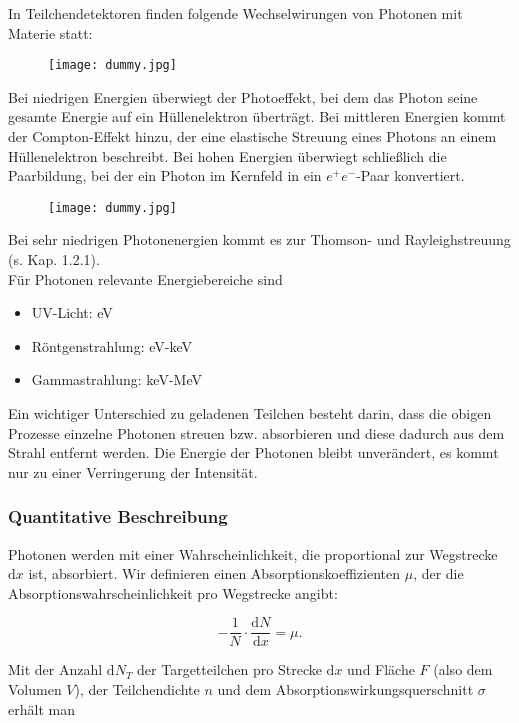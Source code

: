 In Teilchendetektoren finden folgende Wechselwirungen von Photonen mit Materie statt:

\begin{figure}[H]
	\centering
	\texttt{[image: dummy.jpg]}
\end{figure}

Bei niedrigen Energien überwiegt der Photoeffekt, bei dem das Photon seine gesamte Energie auf ein
Hüllenelektron überträgt. Bei mittleren Energien kommt der Compton-Effekt hinzu, der eine elastische
Streuung eines Photons an einem Hüllenelektron beschreibt. Bei hohen Energien überwiegt schließlich
die Paarbildung, bei der ein Photon im Kernfeld in ein $e^+e^-$-Paar konvertiert.

\begin{figure}[H]
	\centering
	\texttt{[image: dummy.jpg]}
\end{figure}

Bei sehr niedrigen Photonenergien kommt es zur Thomson- und Rayleighstreuung (s. Kap. 1.2.1).
\\
Für Photonen relevante Energiebereiche sind  

\begin{itemize}
  \item UV-Licht: eV
  \item Röntgenstrahlung: eV-keV
  \item Gammastrahlung: keV-MeV
\end{itemize}

Ein wichtiger Unterschied zu geladenen Teilchen besteht darin, dass die obigen Prozesse einzelne
Photonen streuen bzw. absorbieren und diese dadurch aus dem Strahl entfernt werden. Die Energie der
Photonen bleibt unverändert, es kommt nur zu einer Verringerung der Intensität.

\subsubsection*{Quantitative Beschreibung}

Photonen werden mit einer Wahrscheinlichkeit, die proportional zur Wegstrecke $\mathrm{d}x$ ist,
absorbiert. Wir definieren einen Absorptionskoeffizienten $\mu$, der die
Absorptionswahrscheinlichkeit pro Wegstrecke angibt:

\[ -\frac{1}{N}\cdot\frac{\mathrm{d}N}{\mathrm{d}x}=\mu.\]

Mit der Anzahl $\mathrm{d}N_T$ der Targetteilchen pro Strecke $\mathrm{d}x$ und Fläche $F$ (also
dem Volumen $V$), der Teilchendichte $n$ und dem Absorptionswirkungsquerschnitt $\sigma$ erhält man

